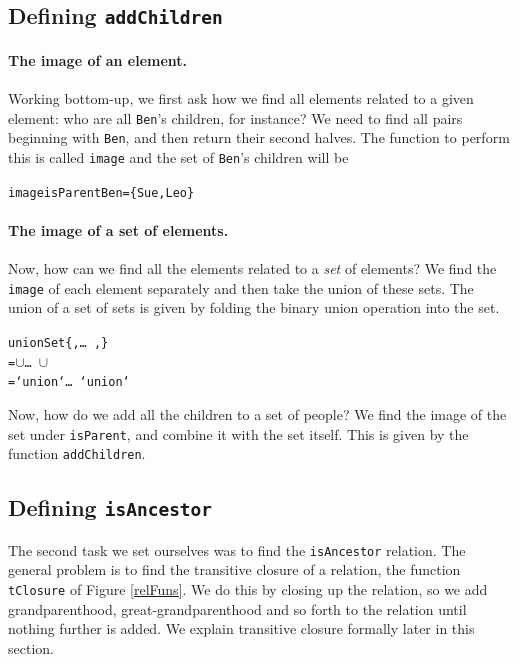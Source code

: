 \subsection*{Defining \texttt{addChildren}}

\paragraph{The image of an element.}
Working bottom-up, we first ask how we find all elements related to a given
element: who are all \texttt{Ben}'s children, for instance? We need to find all
pairs beginning with \texttt{Ben}, and then return their second halves. The
function to perform this is called \texttt{image}
and the set of \texttt{Ben}'s children will be 
\begin{alltt}
image isParent Ben = \{Sue,Leo\}
\end{alltt}

\paragraph{The image of a set of elements.}
Now, how can we find all the elements related to a {\em set} of elements? We
find the \texttt{image} of each element separately  and then take the union of
these sets.
The union of a set of sets is given by folding the binary union
operation into the set.
\begin{alltt}
unionSet \{, \ldots\ ,\}
  =  \(\cup\) \ldots\ \(\cup\)\  
  =  `union` \ldots\ `union` 
\end{alltt}
Now, how do we add all the children to a set of people? We find the image of
the set under \texttt{isParent}, and combine it with the set itself. This is
given by the function \texttt{addChildren}.

\subsection*{Defining \texttt{isAncestor}}

The second task we set ourselves was to find the \texttt{isAncestor}
relation.
The general problem is to find the transitive closure of a
relation, the function \texttt{tClosure} of Figure \ref{relFuns}. We do this by
closing up the relation, so we add grandparenthood,  great-grandparenthood
and so forth to the relation until nothing further is added. We explain
transitive closure formally later in this section.

